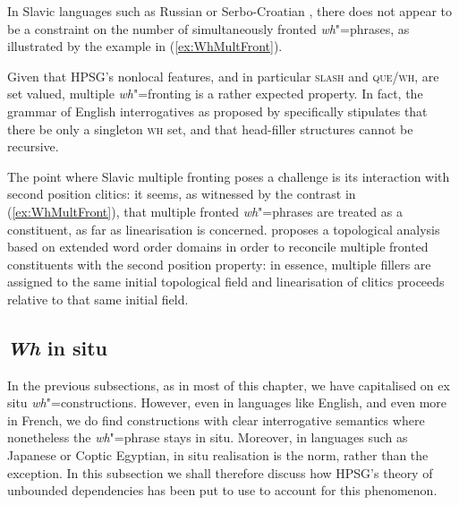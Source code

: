 \documentclass[output=paper
	        ,collection
	        ,collectionchapter
 	        ,biblatex
                ,babelshorthands
                ,newtxmath
                ,draftmode
                ,colorlinks, citecolor=brown
]{langscibook}
\begin{document}
{In Slavic languages such as Russian or Serbo-Croatian \citep{Penn:99},
there does not appear to be a constraint on the number of
simultaneously fronted \emph{wh}"=phrases, as illustrated by the
example in (\ref{ex:WhMultFront}).

\begin{exe}
  \ex \label{ex:WhMultFront}
  \begin{xlist}
 
  \end{xlist}
\end{exe}

\noindent
Given that HPSG's nonlocal features, and in particular \textsc{slash}
and \textsc{que/wh}, are set valued, multiple \emph{wh}"=fronting is a
rather expected property. In fact, the grammar of English
interrogatives as proposed by \citet{Ginzburg:Sag:01} specifically
stipulates that there be only a singleton \textsc{wh} set, and that
head-filler structures cannot be recursive.

The point where Slavic multiple fronting poses a challenge is its
interaction with second position clitics: it seems, as witnessed by
the contrast in (\ref{ex:WhMultFront}), that multiple fronted
\emph{wh}"=phrases are treated as a constituent, as far as
linearisation is concerned. \citet{Penn:99} proposes a topological
analysis based on extended word order domains
\citep{Reape:90,kathol_a00} in order to reconcile multiple fronted
constituents with the second position property: in essence, multiple
fillers are assigned to the same initial topological field and
linearisation of clitics proceeds relative to that same initial field.


\subsection{\emph{Wh} in situ}
\label{sec:UDC:WhInSitu}

In the previous subsections, as in most of this chapter, we have
capitalised on ex situ \emph{wh}"=constructions. However, even in
languages like English, and even more in French, we do find
constructions with clear interrogative semantics where nonetheless the
\emph{wh}"=phrase stays in situ. Moreover, in languages such as
Japanese or Coptic Egyptian, in situ realisation is the norm, rather
than the exception. In this subsection we shall therefore discuss how
HPSG's theory of unbounded dependencies has been put to use to account
for this phenomenon.

}
\end{document}
